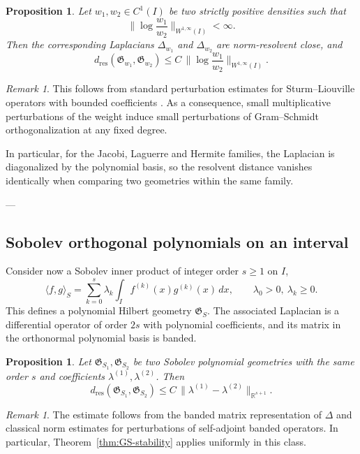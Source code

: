 \documentclass{amsart}
\numberwithin{equation}{section}
\newtheorem{proposition}[theorem]{Proposition}
\theoremstyle{definition}
\theoremstyle{remark}
\newtheorem{remark}[theorem]{Remark}
\begin{document}
\begin{proposition}
Let $w_1,w_2\in C^1(I)$ be two strictly positive densities such that
\[
\Big\|\log\frac{w_1}{w_2}\Big\|_{W^{1,\infty}(I)}<\infty.
\]
Then the corresponding Laplacians $\Delta_{w_1}$ and $\Delta_{w_2}$ are
norm-resolvent close, and
\[
d_{\mathrm{res}}(\mathfrak G_{w_1},\mathfrak G_{w_2})
\le C\,\Big\|\log\frac{w_1}{w_2}\Big\|_{W^{1,\infty}(I)}.
\]
\end{proposition}

\begin{remark}
This follows from standard perturbation estimates for Sturm--Liouville operators
with bounded coefficients \cite{Kato,Ouhabaz}.
As a consequence, small multiplicative perturbations of the weight induce
small perturbations of Gram--Schmidt orthogonalization at any fixed degree.
\end{remark}

In particular, for the Jacobi, Laguerre and Hermite families,
the Laplacian is diagonalized by the polynomial basis, so the resolvent
distance vanishes identically when comparing two geometries within the same family.

---

\subsection{Sobolev orthogonal polynomials on an interval}

Consider now a Sobolev inner product of integer order $s\ge1$ on $I$,
\[
\langle f,g\rangle_{S}
=
\sum_{k=0}^s \lambda_k \int_I f^{(k)}(x)g^{(k)}(x)\,dx,
\qquad \lambda_0>0,\ \lambda_k\ge0.
\]
This defines a polynomial Hilbert geometry $\mathfrak G_S$.
The associated Laplacian
is a differential operator of order $2s$ with polynomial coefficients,
and its matrix in the orthonormal polynomial basis is banded.

\begin{proposition}
Let $\mathfrak G_{S_1},\mathfrak G_{S_2}$ be two Sobolev polynomial geometries
with the same order $s$ and coefficients $\lambda^{(1)},\lambda^{(2)}$.
Then
\[
d_{\mathrm{res}}(\mathfrak G_{S_1},\mathfrak G_{S_2})
\le C\,\|\lambda^{(1)}-\lambda^{(2)}\|_{\mathbb R^{s+1}}.
\]
\end{proposition}

\begin{remark}
The estimate follows from the banded matrix representation of $\Delta$
and classical norm estimates for perturbations of self-adjoint banded operators.
In particular, Theorem~\ref{thm:GS-stability} applies uniformly in this class.
\end{remark}
\end{document}
